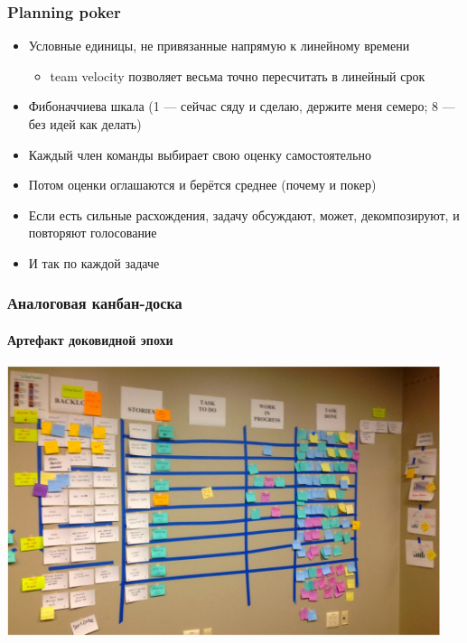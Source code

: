 \documentclass[xetex,mathserif,serif]{beamer}
\begin{document}
    \begin{frame}
        \frametitle{Planning poker}
        \begin{itemize}
            \item Условные единицы, не привязанные напрямую к линейному времени
            \begin{itemize}
                \item team velocity позволяет весьма точно пересчитать в линейный срок
            \end{itemize}
            \item Фибоначчиева шкала (1 --- сейчас сяду и сделаю, держите меня семеро; 8 --- без идей как делать)
            \item Каждый член команды выбирает свою оценку самостоятельно
            \item Потом оценки оглашаются и берётся среднее (почему и покер)
            \item Если есть сильные расхождения, задачу обсуждают, может, декомпозируют, и повторяют голосование
            \item И так по каждой задаче
        \end{itemize}
    \end{frame}

    \begin{frame}
        \frametitle{Аналоговая канбан-доска}
        \framesubtitle{Артефакт доковидной эпохи}
        \begin{center}
            \includegraphics[width=0.95\textwidth]{kanban.png}
        \end{center}
    \end{frame}
\end{document}
